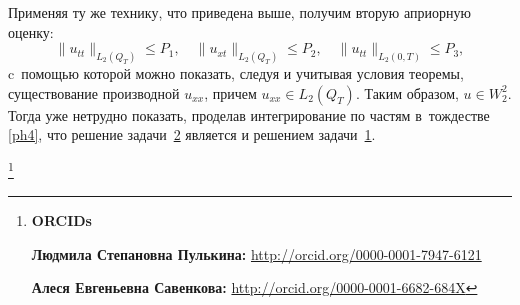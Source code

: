 Применяя ту же технику, что приведена выше, получим вторую априорную оценку:
$$\|u_{tt}\|_{L_2(Q_T)}\leq P_1, \quad \|u_{xt}\|_{L_2(Q_T)}\leq P_2, \quad \|u_{tt}\|_{L_2(0, T)}\leq P_3,$$
c~помощью которой можно показать, следуя  \cite{pulkinals:bib:lad} и учитывая условия теоремы,  существование производной $u_{xx}$, причем $u_{xx}\in L_2(Q_T).$
Таким образом, $u\in W_2^2.$ Тогда уже нетрудно показать, проделав интегрирование по частям в~тождестве \eqref{ph4},
что решение задачи~\hyperlink{sav:task2}{2} является и решением задачи~\hyperlink{sav:task1}{1}.

\smallskip

\thanks{{\bf ORCIDs}

{\bf Людмила Степановна Пулькина:} \url{http://orcid.org/0000-0001-7947-6121}

{\bf Алеся Евгеньевна Савенкова:} \url{http://orcid.org/0000-0001-6682-684X}

}


\RusRef

